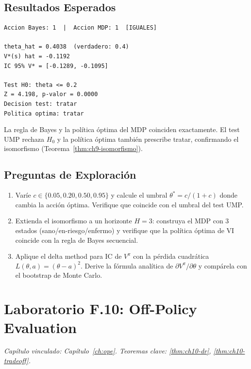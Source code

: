 \subsection*{Resultados Esperados}

\begin{verbatim}
Accion Bayes: 1  |  Accion MDP: 1  [IGUALES]

theta_hat = 0.4038  (verdadero: 0.4)
V*(s) hat = -0.1192
IC 95% V* = [-0.1289, -0.1095]

Test H0: theta <= 0.2
Z = 4.198, p-valor = 0.0000
Decision test: tratar
Politica optima: tratar
\end{verbatim}

La regla de Bayes y la política óptima del MDP coinciden exactamente.
El test UMP rechaza $H_0$ y la política óptima también prescribe tratar,
confirmando el isomorfismo (Teorema~\ref{thm:ch9-isomorfismo}).

\subsection*{Preguntas de Exploración}

\begin{enumerate}
    \item Varíe $c \in \{0.05, 0.20, 0.50, 0.95\}$ y calcule el umbral
          $\theta^* = c/(1+c)$ donde cambia la acción óptima. Verifique que
          coincide con el umbral del test UMP.
    \item Extienda el isomorfismo a un horizonte $H=3$: construya el MDP
          con 3 estados (sano/en-riesgo/enfermo) y verifique que la política
          óptima de VI coincide con la regla de Bayes secuencial.
    \item Aplique el delta method para IC de $V^\pi$ con la pérdida
          cuadrática $L(\theta, a) = (\theta - a)^2$. Derive la fórmula
          analítica de $\partial V^\pi / \partial \theta$ y compárela
          con el bootstrap de Monte Carlo.
\end{enumerate}

\section{Laboratorio F.10: Off-Policy Evaluation}
\label{lab:F10}
\textit{Capítulo vinculado: Capítulo~\ref{ch:ope}.
Teoremas clave: \ref{thm:ch10-dr}, \ref{thm:ch10-tradeoff}.}

